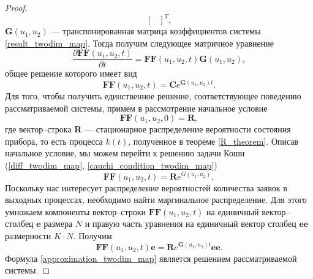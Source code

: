 \begin{proof}
\begin{equation*}
\begin{bmatrix}
		\end{bmatrix}^{T},
	\end{equation*}
	$\boldsymbol{G}(u_{1},u_{2})$ --- транспонированная матрица коэффициентов системы \eqref{result_twodim_map}.
	Тогда получим следующее матричное уравнение
	\begin{equation*}
		\frac{{\partial \boldsymbol{FF}(u_{1},u_{2},t)}}{{\partial t}} =\boldsymbol{FF}(u_{1},u_{2},t)\boldsymbol{G}(u_{1},u_{2}),
	\end{equation*}
	общее решение которого имеет вид
	\begin{equation} \label{diff_twodim_map}
		\boldsymbol{FF}(u_{1},u_{2},t)=\boldsymbol{C}e^{\boldsymbol{G}(u_{1},u_{2})t}.
	\end{equation}
	Для того, чтобы получить единственное решение, соответствующее поведению рассматриваемой системы, примем в рассмотрение начальное условие
	\begin{equation} \label{cauchi_condition_twodim_map}
		\boldsymbol{FF}(u_{1},u_{2},0)=\boldsymbol{R},
	\end{equation}
	где вектор--строка $\boldsymbol{R}$ --- стационарное распределение вероятности состояния прибора, то есть процесса $k(t)$, полученное в теореме \ref{R_theorem}.
	Описав начальное условие, мы можем перейти к решению задачи Коши (\ref{diff_twodim_map}, \ref{cauchi_condition_twodim_map})
	\begin{equation*} 
		\boldsymbol{FF}(u_{1},u_{2},t)=\boldsymbol{R}e^{G(u_{1},u_{2})},
	\end{equation*}
	Поскольку нас интересует распределение вероятностей количества заявок в выходных процессах, необходимо найти маргинальное распределение. Для этого умножаем компоненты вектор--строки $\boldsymbol{FF}(u_{1},u_{2},t)$ на единичный вектор--столбец $\boldsymbol{e}$ размера $N$ и правую часть уравнения на единичный вектор столбец $\boldsymbol{ee}$ размерности $K \cdot N$. Получим
	\begin{equation}\label{approximation_twodim_map}
		\boldsymbol{FF}(u_{1},u_{2},t)\boldsymbol{e}=\boldsymbol{R}e^{\boldsymbol{G}(u_{1},u_{2})t}\boldsymbol{ee}.
	\end{equation}
	Формула \eqref{approximation_twodim_map} является решением рассматриваемой системы. 
\end{proof}

